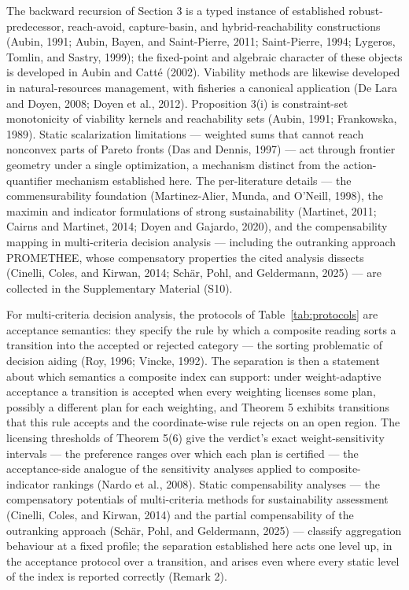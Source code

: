 \documentclass[3p,11pt]{elsarticle}
\begin{document}
The backward recursion of Section 3 is
a typed instance of established robust-predecessor, reach-avoid,
capture-basin, and hybrid-reachability constructions (Aubin, 1991;
Aubin, Bayen, and Saint-Pierre, 2011; Saint-Pierre, 1994; Lygeros,
Tomlin, and Sastry, 1999); the fixed-point and algebraic character of these objects is developed in Aubin and Catt\'e (2002). Viability methods are likewise developed in natural-resources management, with fisheries a canonical application (De Lara and Doyen, 2008; Doyen et al., 2012). Proposition 3(i) is constraint-set
monotonicity of viability kernels and reachability sets (Aubin, 1991;
Frankowska, 1989). Static scalarization limitations --- weighted sums that cannot
reach nonconvex parts of Pareto fronts (Das and Dennis, 1997) --- act
through frontier geometry under a single optimization, a mechanism
distinct from the action-quantifier mechanism established here. The
per-literature details --- the commensurability foundation
(Martinez-Alier, Munda, and O'Neill, 1998), the maximin and indicator
formulations of strong sustainability (Martinet, 2011; Cairns and
Martinet, 2014; Doyen and Gajardo, 2020), and the compensability mapping
in multi-criteria decision analysis --- including the outranking approach
PROMETHEE, whose compensatory properties the cited analysis dissects
(Cinelli, Coles, and Kirwan, 2014; Sch\"ar, Pohl, and Geldermann, 2025) --- are collected in the
Supplementary Material (S10).

For multi-criteria decision analysis, the protocols of
Table~\ref{tab:protocols} are acceptance semantics: they specify the rule
by which a composite reading sorts a transition into the accepted or
rejected category --- the sorting problematic of decision aiding (Roy,
1996; Vincke, 1992). The separation is then a statement about which
semantics a composite index can support: under weight-adaptive acceptance
a transition is accepted when every weighting licenses some plan,
possibly a different plan for each weighting, and Theorem 5 exhibits
transitions that this rule accepts and the coordinate-wise rule rejects
on an open region. The licensing thresholds of Theorem 5(6) give the
verdict's exact weight-sensitivity intervals --- the preference ranges
over which each plan is certified --- the acceptance-side analogue of
the sensitivity analyses applied to composite-indicator rankings
(Nardo et al., 2008). Static compensability analyses --- the
compensatory potentials of multi-criteria methods for sustainability
assessment (Cinelli, Coles, and Kirwan, 2014) and the partial
compensability of the outranking approach (Sch\"ar, Pohl, and
Geldermann, 2025) --- classify aggregation behaviour at a fixed profile;
the separation established here acts one level up, in the acceptance
protocol over a transition, and arises even where every static level of
the index is reported correctly (Remark 2).
\end{document}
